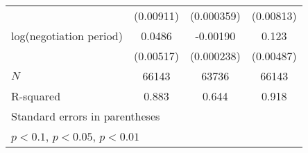 {\begin{tabular}{l*{3}{c}}
            &   (0.00911)         &  (0.000359)         &   (0.00813)         \\
\addlinespace
log(negotiation period)&      0.0486\sym{***}&    -0.00190\sym{***}&       0.123\sym{***}\\
            &   (0.00517)         &  (0.000238)         &   (0.00487)         \\
\midrule
\(N\)       &       66143         &       63736         &       66143         \\
R-squared   &       0.883         &       0.644         &       0.918         \\
\bottomrule
\multicolumn{4}{l}{\footnotesize Standard errors in parentheses}\\
\multicolumn{4}{l}{\footnotesize \sym{*} \(p<0.1\), \sym{**} \(p<0.05\), \sym{***} \(p<0.01\)}\\
\end{tabular}
}

